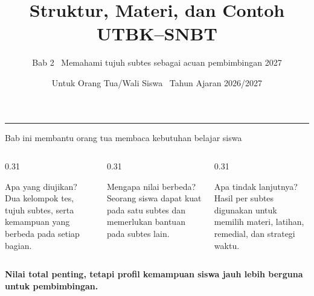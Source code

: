 \renewcommand{\currentchapter}{2}
\title{Struktur, Materi, dan Contoh\\UTBK--SNBT}
\subtitle{Bab 2 \textbar\ Memahami tujuh subtes sebagai acuan pembimbingan 2027}
\date{Untuk Orang Tua/Wali Siswa \textbar\ Tahun Ajaran 2026/2027}

\begingroup
{}
\begin{frame}[plain]
  \vspace{0.65cm}
  \vspace{0.08cm}
  {\color{StudentWhite}\inserttitle\par}
  \vspace{0.36cm}
  {\color{StudentSoft}\insertsubtitle\par}
  \vfill
  {\color{StudentGold}\rule{2.3cm}{2.5pt}}\par
  \vspace{0.20cm}
  {\color{StudentWhite}\insertauthor}\par
  {\color{StudentSoft}\insertdate}
  \vspace{0.42cm}
\end{frame}
\endgroup

\begin{frame}{Bab ini membantu orang tua membaca kebutuhan belajar siswa}
  \begin{columns}[T,onlytextwidth]
    \begin{column}{0.31\textwidth}
      \begin{block}{Apa yang diujikan?}
        Dua kelompok tes, tujuh subtes, serta kemampuan yang berbeda pada setiap bagian.
      \end{block}
    \end{column}
    \begin{column}{0.31\textwidth}
      \begin{block}{Mengapa nilai berbeda?}
        Seorang siswa dapat kuat pada satu subtes dan memerlukan bantuan pada subtes lain.
      \end{block}
    \end{column}
    \begin{column}{0.31\textwidth}
      \begin{block}{Apa tindak lanjutnya?}
        Hasil per subtes digunakan untuk memilih materi, latihan, remedial, dan strategi waktu.
      \end{block}
    \end{column}
  \end{columns}
  \vspace{0.18cm}
  \centering
  {\color{StudentNavy}\bfseries\fontsize{13}{16}\selectfont Nilai total penting, tetapi profil kemampuan siswa jauh lebih berguna untuk pembimbingan.}
\end{frame}

